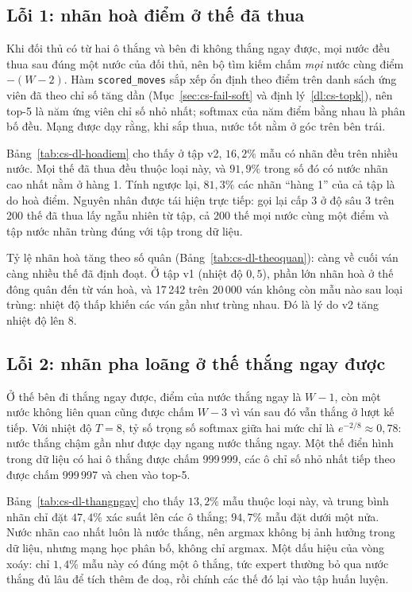 \subsection{Lỗi 1: nhãn hoà điểm ở thế đã thua}
\label{sec:cs-hoa-diem}
Khi đối thủ có từ hai ô thắng và bên đi không thắng ngay được, mọi nước đều thua sau đúng một nước của đối thủ, nên
bộ tìm kiếm chấm \emph{mọi} nước cùng điểm $-(W-2)$. Hàm \texttt{scored\_moves} sắp xếp ổn định theo điểm trên danh
sách ứng viên đã theo chỉ số tăng dần (Mục~\ref{sec:cs-fail-soft} và định lý~\ref{dl:cs-topk}), nên top-5 là năm ứng
viên chỉ số nhỏ nhất; softmax của năm điểm bằng nhau là phân bố đều. Mạng được dạy rằng, khi sắp thua, nước tốt nằm
ở góc trên bên trái.


Bảng~\ref{tab:cs-dl-hoadiem} cho thấy ở tập v2, $16{,}2\%$ mẫu có nhãn đều trên nhiều nước. Mọi thế đã thua đều thuộc
loại này, và $91{,}9\%$ trong số đó có nước nhãn cao nhất nằm ở hàng 1. Tính ngược lại, $81{,}3\%$ các nhãn ``hàng 1''
của cả tập là do hoà điểm. Nguyên nhân được tái hiện trực tiếp: gọi lại cấp 3 ở độ sâu 3 trên 200 thế đã thua lấy
ngẫu nhiên từ tập, cả 200 thế mọi nước cùng một điểm và tập nước nhãn trùng đúng với tập trong dữ liệu.


Tỷ lệ nhãn hoà tăng theo số quân (Bảng~\ref{tab:cs-dl-theoquan}): càng về cuối ván càng nhiều thế đã định đoạt. Ở
tập v1 (nhiệt độ $0{,}5$), phần lớn nhãn hoà ở thế đông quân đến từ ván hoà, và 17\,242 trên 20\,000 ván không còn mẫu
nào sau loại trùng: nhiệt độ thấp khiến các ván gần như trùng nhau. Đó là lý do v2 tăng nhiệt độ lên 8.

\subsection{Lỗi 2: nhãn pha loãng ở thế thắng ngay được}
Ở thế bên đi thắng ngay được, điểm của nước thắng ngay là $W-1$, còn một nước không liên quan cũng được chấm $W-3$ vì
ván sau đó vẫn thắng ở lượt kế tiếp. Với nhiệt độ $T=8$, tỷ số trọng số softmax giữa hai mức chỉ là
$e^{-2/8}\approx0{,}78$: nước thắng chậm gần như được dạy ngang nước thắng ngay. Một thế điển hình trong dữ liệu có
hai ô thắng được chấm 999\,999, các ô chỉ số nhỏ nhất tiếp theo được chấm 999\,997 và chen vào top-5.


Bảng~\ref{tab:cs-dl-thangngay} cho thấy $13{,}2\%$ mẫu thuộc loại này, và trung bình nhãn chỉ đặt $47{,}4\%$ xác suất
lên các ô thắng; $94{,}7\%$ mẫu đặt dưới một nửa. Nước nhãn cao nhất luôn là nước thắng, nên argmax không bị ảnh hưởng
trong dữ liệu, nhưng mạng học phân bố, không chỉ argmax. Một dấu hiệu của vòng xoáy: chỉ $1{,}4\%$ mẫu này có đúng một
ô thắng, tức expert thường bỏ qua nước thắng đủ lâu để tích thêm đe doạ, rồi chính các thế đó lại vào tập huấn luyện.

